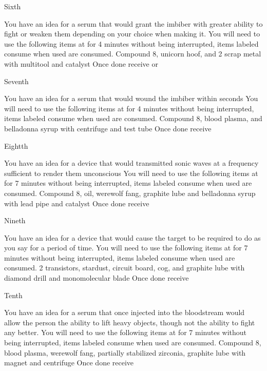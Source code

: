 \documentclass[greennotebook]{guildcamp3} %
\begin{document}
\begin{page}{Sixth}
	
	You have an idea for a serum that would grant the imbiber with greater ability to fight or weaken them depending on your choice when making it.
	You will need to use the following items at \sSciWorkbench{} for 4 minutes without being interrupted, items labeled consume when used are consumed.
	Compound 8, unicorn hoof, and 2 scrap metal with multitool and catalyst
	Once done receive \iCRUpSerum{} or \iCRDownSerum{}
	
\end{page}

\begin{page}{Seventh}
	
	You have an idea for a serum that would wound the imbiber within seconds
	You will need to use the following items at \sSciWorkbench{} for 4 minutes without being interrupted, items labeled consume when used are consumed.
	Compound 8, blood plasma, and belladonna syrup with centrifuge and test tube
	Once done receive \iTechPoison{}
	
\end{page}

\begin{page}{Eightth}
	
	You have an idea for a device that would transmitted sonic waves at a frequency sufficient to render them unconscious
	You will need to use the following items at \sSciWorkbench{} for 7 minutes without being interrupted, items labeled consume when used are consumed.
	Compound 8, oil, werewolf fang, graphite lube and belladonna syrup with lead pipe and catalyst
	Once done receive \iSonicKO{}
	
\end{page}

\begin{page}{Nineth}
	
	You have an idea for a device that would cause the target to be required to do as you say for a period of time.
	You will need to use the following items at \sSciWorkbench{} for 7 minutes without being interrupted, items labeled consume when used are consumed.
	2 transistors, stardust, circuit board, cog, and graphite lube with diamond drill and monomolecular blade
	Once done receive \iMCDevice{}
	
\end{page}

\begin{page}{Tenth}
	
	You have an idea for a serum that once injected into the bloodstream would allow the person the ability to lift heavy objects, though not the ability to fight any better.
	You will need to use the following items at \sSciWorkbench{} for 7 minutes without being interrupted, items labeled consume when used are consumed.
	Compound 8, blood plasma, werewolf fang, partially stabilized zirconia, graphite lube with magnet and centrifuge
	Once done receive \iSteroids{}
	
\end{page}
\end{document}
